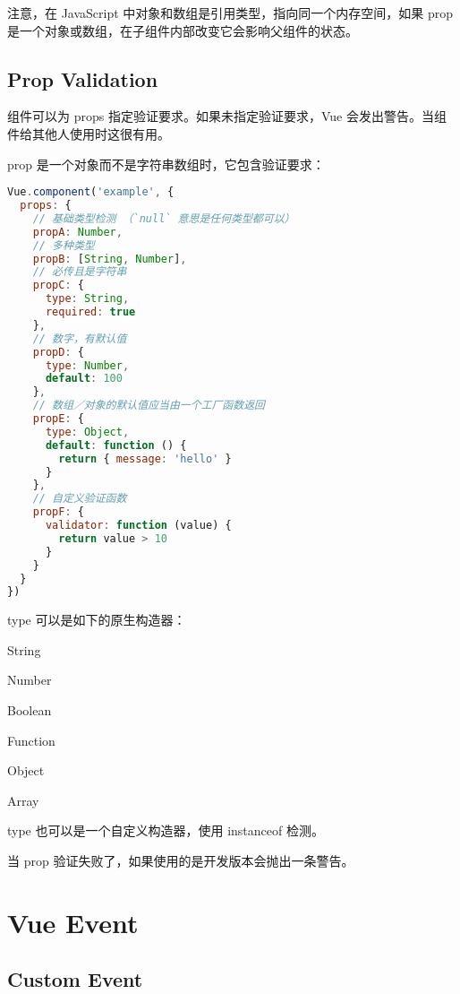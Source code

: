 注意，在 JavaScript 中对象和数组是引用类型，指向同一个内存空间，如果 prop 是一个对象或数组，在子组件内部改变它会影响父组件的状态。

\section{Prop Validation}

组件可以为 props 指定验证要求。如果未指定验证要求，Vue 会发出警告。当组件给其他人使用时这很有用。


prop 是一个对象而不是字符串数组时，它包含验证要求：



\begin{lstlisting}[language=JavaScript]
Vue.component('example', {
  props: {
    // 基础类型检测 （`null` 意思是任何类型都可以）
    propA: Number,
    // 多种类型
    propB: [String, Number],
    // 必传且是字符串
    propC: {
      type: String,
      required: true
    },
    // 数字，有默认值
    propD: {
      type: Number,
      default: 100
    },
    // 数组／对象的默认值应当由一个工厂函数返回
    propE: {
      type: Object,
      default: function () {
        return { message: 'hello' }
      }
    },
    // 自定义验证函数
    propF: {
      validator: function (value) {
        return value > 10
      }
    }
  }
})
\end{lstlisting}

type 可以是如下的原生构造器：

\begin{compactitem}
\item String
\item Number
\item Boolean
\item Function
\item Object
\item Array
\end{compactitem}

type 也可以是一个自定义构造器，使用 instanceof 检测。

当 prop 验证失败了，如果使用的是开发版本会抛出一条警告。

\chapter{Vue Event}

\section{Custom Event}


